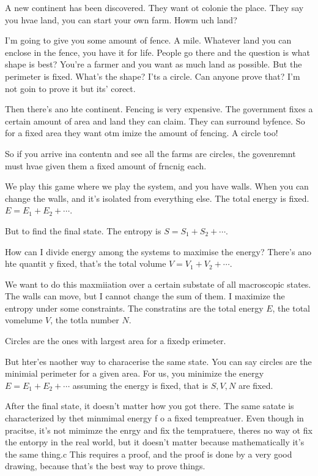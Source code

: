 A new continent has been discovered.
They want ot colonie the place.
They say you hvae land,
you can start your own farm.
Howm uch land?

I'm going to give you some amount of fence.
A mile.
Whatever land you can enclose in the fence,
you have it for life.
People go there and the question is what shape is best?
You're a farmer and you want as much land as possible.
But the perimeter is fixed.
What's the shape?
I'ts a circle.
Can anyone prove that?
I'm not goin to prove it but its' corect.


Then there's ano hte continent.
Fencing is very expensive.
The government fixes a certain amount of area and land they can claim.
They can surround byfence.
So for a fixed area they want otm imize the amount of fencing.
A circle too!

So if you arrive ina contentn and see all the farms are circles,
the govenremnt must hvae given them a fixed amount of frncnig each.

We play this game where we play the system,
and you have walls.
When you can change the walls,
and it's isolated from everything else.
The total energy is fixed.
$E = E_1 + E_2 + \cdots$.

But to find the final state.
The entropy is
$S=S_1+S_2+\cdots$.

How can I divide energy among the systems to maximise the energy?
There's ano hte quantit y fixed,
that's the total volume
$V=V_1+V_2+\cdots$.

We want to do this maxmiiation over a certain substate of all macroscopic
states.
The walls can move,
but I cannot change the sum of them.
I maximize the entropy under some constraints.
The constratins are the total energy $E$,
the total vomelume $V$, the totla number $N$.

Circles are the ones with largest area for a fixedp erimeter.

But hter'es naother way to characerise the same state.
You can say circles are the minimial perimeter for a given area.
For us,
you minimize the energy $E=E_1+E_2+\cdots$
assuming the energy is fixed,
that is $S,V,N$ are fixed.

After the final state,
it doesn't matter how you got there.
The same satate is characterized by thet minmimal energy
f o a fixed tempreatuer.
Even though in pracitse,
it's not mimimze the enrgy and fix the tempratuere,
theres no way ot fix the entorpy in the real world,
but it doesn't matter because mathematically it's the same thing.c
This requires a proof,
and the proof is done by a very good drawing,
because that's the best way to prove things.

